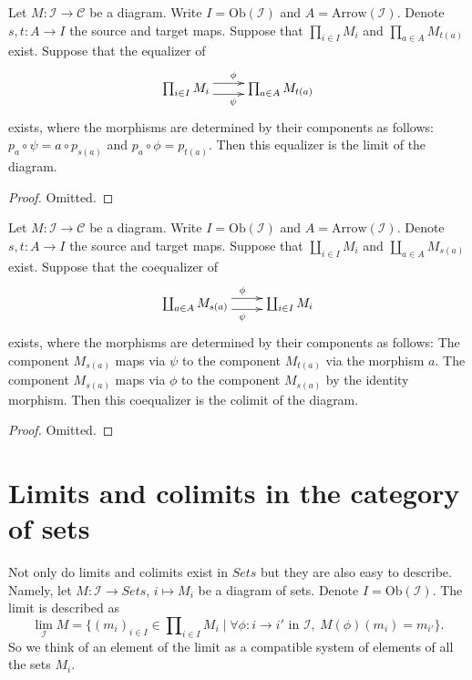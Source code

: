 \begin{lemma}
\label{lemma-limits-products-equalizers}
Let $M : \mathcal{I} \to \mathcal{C}$ be a diagram.
Write $I = \text{Ob}(\mathcal{I})$ and $A = \text{Arrow}(\mathcal{I})$.
Denote $s, t : A \to I$ the source and target maps.
Suppose that $\prod_{i \in I} M_i$ and $\prod_{a \in A} M_{t(a)}$
exist. Suppose that the equalizer of
$$
\xymatrix{
\prod_{i \in I} M_i
\ar@<1ex>[r]^\phi \ar@<-1ex>[r]_\psi
&
\prod_{a \in A} M_{t(a)}
}
$$
exists, where the morphisms are determined by their components
as follows: $p_a \circ \psi = a \circ p_{s(a)}$
and $p_a \circ \phi = p_{t(a)}$. Then this equalizer is the
limit of the diagram.
\end{lemma}

\begin{proof}
Omitted.
\end{proof}


\begin{lemma}
\label{lemma-colimits-coproducts-coequalizers}
Let $M : \mathcal{I} \to \mathcal{C}$ be a diagram.
Write $I = \text{Ob}(\mathcal{I})$ and $A = \text{Arrow}(\mathcal{I})$.
Denote $s, t : A \to I$ the source and target maps.
Suppose that $\coprod_{i \in I} M_i$ and $\coprod_{a \in A} M_{s(a)}$
exist. Suppose that the coequalizer of
$$
\xymatrix{
\coprod_{a \in A} M_{s(a)}
\ar@<1ex>[r]^\phi \ar@<-1ex>[r]_\psi
&
\coprod_{i \in I} M_{i}
}
$$
exists, where the morphisms are determined by their components
as follows: The component $M_{s(a)}$ maps via $\psi$
to the component $M_{t(a)}$ via the morphism $a$.
The component $M_{s(a)}$ maps via $\phi$ to the component
$M_{s(a)}$ by the identity morphism. Then this coequalizer is the
colimit of the diagram.
\end{lemma}

\begin{proof}
Omitted.
\end{proof}







\section{Limits and colimits in the category of sets}
\label{section-limit-sets}

\noindent
Not only do limits and colimits exist in $\textit{Sets}$
but they are also easy to describe. Namely, let $M : \mathcal{I}
\to \textit{Sets}$, $i \mapsto M_i$ be a diagram of sets.
Denote $I = \text{Ob}(\mathcal{I})$.
The limit is described as
$$
\lim_{\mathcal{I}} M
=
\{
(m_i)_{i\in I} \in \prod\nolimits_{i\in I} M_i
\mid
\forall \phi : i \to i' \text{ in }\mathcal{I}, \ 
M(\phi)(m_i) = m_{i'}
\}.
$$
So we think of an element of the limit as a compatible system of elements
of all the sets $M_i$.

